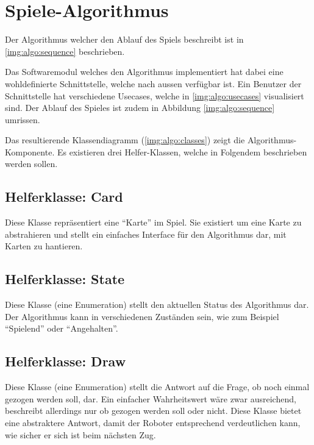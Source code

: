 \chapter{Spiele-Algorithmus}

    Der Algorithmus welcher den Ablauf des Spiels beschreibt ist in
    \ref{img:algo:sequence} beschrieben.

    Das Softwaremodul welches den Algorithmus implementiert hat dabei eine
    wohldefinierte Schnittstelle, welche nach aussen verfügbar ist.
    Ein Benutzer der Schnittstelle hat verschiedene Usecases, welche in
    \ref{img:algo:usecases} visualisiert sind.
    Der Ablauf des Spieles ist zudem in Abbildung \ref{img:algo:sequence}
    umrissen.

    Das resultierende Klassendiagramm (\ref{img:algo:classes}) zeigt die
    Algorithmus-Komponente.
    Es existieren drei Helfer-Klassen, welche in Folgendem beschrieben werden
    sollen.

    \section{Helferklasse: Card}

        Diese Klasse repräsentiert eine ``Karte'' im Spiel.
        Sie existiert um eine Karte zu abstrahieren und stellt ein einfaches
        Interface für den Algorithmus dar, mit Karten zu hantieren.

    \section{Helferklasse: State}

        Diese Klasse (eine Enumeration) stellt den aktuellen Status des
        Algorithmus dar.
        Der Algorithmus kann in verschiedenen Zuständen sein, wie zum Beispiel
        ``Spielend'' oder ``Angehalten''.

    \section{Helferklasse: Draw}

        Diese Klasse (eine Enumeration) stellt die Antwort auf die Frage, ob
        noch einmal gezogen werden soll, dar.
        Ein einfacher Wahrheitswert wäre zwar ausreichend, beschreibt allerdings
        nur ob gezogen werden soll oder nicht.
        Diese Klasse bietet eine abstraktere Antwort, damit der Roboter
        entsprechend verdeutlichen kann, wie sicher er sich ist beim nächsten
        Zug.

